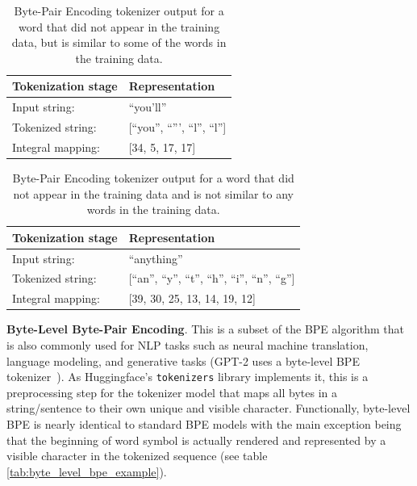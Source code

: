 \documentclass[12pt]{article}
\begin{document}
\begin{table}[h!]
    \centering
    \begin{tabular}{l l}
        \toprule
        Tokenization stage & Representation                 \\
        \midrule
        Input string:      & ``you'll''                     \\
        Tokenized string:  & [``you'', ``''', ``l'', ``l''] \\
        Integral mapping:  & [34, 5, 17, 17]                \\
        \bottomrule
    \end{tabular}
    \caption{Byte-Pair Encoding tokenizer output for a word that did not appear in the training data, but is similar to some of the words in the
        training data.}
    \label{tab:bpe_unk_similar}
\end{table}

\begin{table}[h!]
    \centering
    \begin{tabular}{l l}
        \toprule
        Tokenization stage & Representation                                     \\
        \midrule
        Input string:      & ``anything''                                       \\
        Tokenized string:  & [``an'', ``y'', ``t'', ``h'', ``i'', ``n'', ``g''] \\
        Integral mapping:  & [39, 30, 25, 13, 14, 19, 12]                       \\
        \bottomrule
    \end{tabular}
    \caption{Byte-Pair Encoding tokenizer output for a word that did not appear in the training data and is not similar to any words in the training
        data.}
    \label{tab:bpe_unk}
\end{table}

\textbf{Byte-Level Byte-Pair Encoding}. This is a subset of the BPE algorithm that is also commonly used for NLP tasks such as neural machine
translation, language modeling, and generative tasks (GPT-2 uses a byte-level BPE tokenizer~\cite{radford_language_2019}). As Huggingface's
\lstinline|tokenizers| library implements it, this is a preprocessing step for the tokenizer model that maps all bytes in a string/sentence to their
own unique and visible character. Functionally, byte-level BPE is nearly identical to standard BPE models with the main exception being that the
beginning of word symbol is actually rendered and represented by a visible character in the tokenized sequence (see table
\ref{tab:byte_level_bpe_example}).
\end{document}
